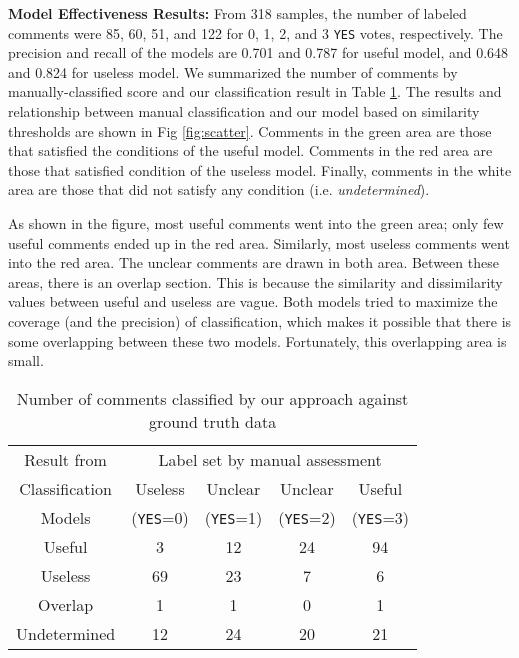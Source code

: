 \textbf{Model Effectiveness Results:} From 318 samples, the number of labeled comments were 85, 60, 51, and 122 for 0, 1, 2, and 3 \texttt{YES} votes, respectively.
The precision and recall of the models are 0.701 and 0.787 for useful model, and 0.648 and 0.824 for useless model.
We summarized the number of comments by manually-classified score and our classification result in Table \ref{tb:classify_number}.
The results and relationship between manual classification and our model based on similarity thresholds are shown in Fig  \ref{fig:scatter}.
Comments in the green area are those that satisfied the conditions of the useful model.
Comments in the red area are those that satisfied condition of the useless model.
Finally, comments in the white area are those that did not satisfy any condition (i.e. \emph{undetermined}). 


As shown in the figure, most useful comments went into the green area; only few useful comments ended up in the red area.
Similarly, most useless comments went into the red area.
The unclear comments are drawn in both area.
Between these areas, there is an overlap section.
This is because the similarity and dissimilarity values between useful and useless are vague.
Both models tried to maximize the coverage (and the precision) of classification, which makes it possible that there is some overlapping between these two models.
Fortunately, this overlapping area is small.


\begin{table}[!t]
\centering
\small
\caption{Number of comments classified by our approach against ground truth data}
\begin{tabular}{ccccc}
\hline
Result from & \multicolumn{4}{c}{Label set by manual assessment} \\ \cline{2-5}
Classification &  Useless  & Unclear  & Unclear & Useful \\
Models&  (\texttt{YES}=0) & (\texttt{YES}=1) & (\texttt{YES}=2) & (\texttt{YES}=3) \\
\hline \hline
Useful & 3 & 12 & 24 & 94 \\
Useless & 69 & 23 & 7 & 6 \\
Overlap & 1 & 1 & 0 & 1 \\
Undetermined & 12 & 24 & 20 & 21 \\
\hline
\end{tabular}
\label{tb:classify_number}
\end{table}

